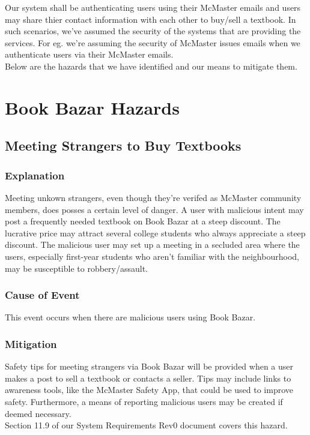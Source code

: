 \documentclass[fullpage]{article}
\begin{document}
Our system shall be authenticating users using their McMaster emails and users may share thier contact information with each other to buy/sell a textbook. In such scenarios, we've assumed the security of the systems that are providing the services. For eg. we're assuming the security of McMaster issues emails when we authenticate users via their McMaster emails.\\
\newline
Below are the hazards that we have identified and our means to mitigate them.

\section{Book Bazar Hazards}

\subsection{Meeting Strangers to Buy Textbooks}
\subsubsection*{Explanation}
Meeting unkown strangers, even though they're verifed as McMaster community members, does posses a certain level of danger. A user with malicious intent may post a frequently needed textbook on Book Bazar at a steep discount. The lucrative price may attract several college students who always appreciate a steep discount. The malicious user may set up a meeting in a secluded area where the users, especially first-year students who aren't familiar with the neighbourhood, may be susceptible to robbery/assault.

\subsubsection*{Cause of Event}
This event occurs when there are malicious users using Book Bazar.

\subsubsection*{Mitigation}
Safety tips for meeting strangers via Book Bazar will be provided when a user makes a post to sell a textbook or contacts a seller. Tips may include links to awareness tools, like the McMaster Safety App, that could be used to improve safety. Furthermore, a means of reporting malicious users may be created if deemed necessary.\\
\newline
Section 11.9 of our System Requirements Rev0 document covers this hazard.
\end{document}
